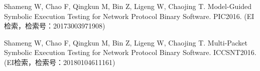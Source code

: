 \begin{resume}
\begin{enumerate}[{[}1{]}]
  \item Shameng W, Chao F, Qingkun M, Bin Z, Ligeng W, Chaojing T. Model-Guided
  Symbolic Execution Testing for Network Protocol Binary Software. PIC2016. (EI
  检索，检索号：20173003971908)
  
  \item Shameng W, Chao F, Qingkun M, Bin Z, Ligeng W, Chaojing T. Multi-Packet
  Symbolic Execution Testing for Network Protocol Binary Software. ICCSNT2016.
  (EI检索，检索号：20180104611161)

%  
%  
%  
%  
%  
%    
%  
%  
%  
%  
  

\end{enumerate}
\end{resume}
